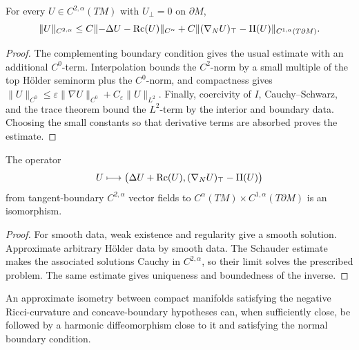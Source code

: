 \begin{lemma}
\label{lem:chow-iv-linearized-harmonic-boundary-schauder}
For every \(U\in C^{2,\alpha}(TM)\) with \(U_\perp=0\) on \(\partial M\),
\[
 \|U\|_{C^{2,\alpha}}
 \le C\|{-\Delta U-\operatorname{Rc}(U)}\|_{C^\alpha}
 +C\|(\nabla_NU)_{\top}-\mathrm{II}(U)\|_{C^{1,\alpha}(T\partial M)}.
\]
\end{lemma}
\begin{proof}
The complementing boundary condition gives the usual estimate with an
additional \(C^0\)-term.  Interpolation bounds the \(C^2\)-norm by a small
multiple of the top Hölder seminorm plus the \(C^0\)-norm, and compactness gives
\(\|U\|_{C^0}\le\varepsilon\|\nabla U\|_{C^0}+C_\varepsilon\|U\|_{L^2}\).
Finally, coercivity of \(I\), Cauchy--Schwarz, and the trace theorem bound the
\(L^2\)-term by the interior and boundary data.  Choosing the small constants
so that derivative terms are absorbed proves the estimate.
\end{proof}

\begin{lemma}
\label{lem:chow-iv-linearized-harmonic-boundary-operator-invertible}
The operator
\[
 U\longmapsto
 \bigl(\Delta U+\operatorname{Rc}(U),(\nabla_NU)_{\top}-\mathrm{II}(U)\bigr)
\]
from tangent-boundary \(C^{2,\alpha}\) vector fields to
\(C^\alpha(TM)\times C^{1,\alpha}(T\partial M)\) is an isomorphism.
\end{lemma}
\begin{proof}
For smooth data, weak existence and regularity give a smooth solution.  Approximate
arbitrary Hölder data by smooth data.  The Schauder estimate makes the associated
solutions Cauchy in \(C^{2,\alpha}\), so their limit solves the prescribed
problem.  The same estimate gives uniqueness and boundedness of the inverse.
\end{proof}

\begin{claim}
\label{clm:chow-iv-harmonic-diffeomorphism-near-approximate-isometry}
An approximate isometry between compact manifolds satisfying the negative
Ricci-curvature and concave-boundary hypotheses can, when sufficiently close,
be followed by a harmonic diffeomorphism close to it and satisfying the normal
boundary condition.
\end{claim}

